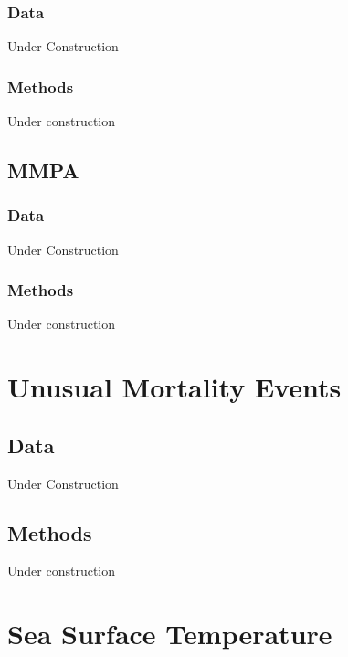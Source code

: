 \documentclass[
]{book}
\begin{document}
\hypertarget{data-5}{%
\subsection{Data}\label{data-5}}

Under Construction

\hypertarget{methods-5}{%
\subsection{Methods}\label{methods-5}}

Under construction

\hypertarget{mmpa}{%
\section{MMPA}\label{mmpa}}

\hypertarget{data-6}{%
\subsection{Data}\label{data-6}}

Under Construction

\hypertarget{methods-6}{%
\subsection{Methods}\label{methods-6}}

Under construction

\hypertarget{unusual-mortality-events}{%
\chapter{Unusual Mortality Events}\label{unusual-mortality-events}}

\hypertarget{data-7}{%
\section{Data}\label{data-7}}

Under Construction

\hypertarget{methods-7}{%
\section{Methods}\label{methods-7}}

Under construction

\hypertarget{sea-surface-temperature}{%
\chapter{Sea Surface Temperature}\label{sea-surface-temperature}}
\end{document}
